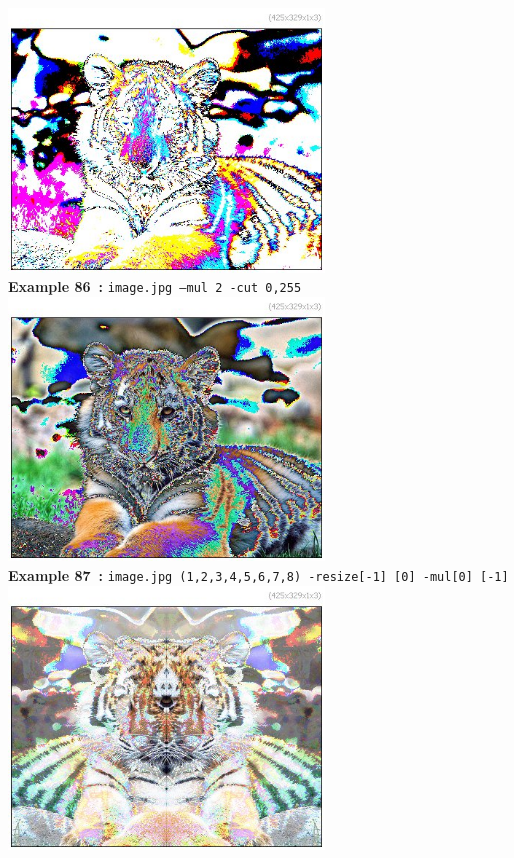 \documentclass[a4paper,11pt,twoside]{book}
\begin{document}
\begin{center}\includegraphics[keepaspectratio=true,height=7cm,width=\textwidth]{img/gmic_def86.jpg}\\
{\footnotesize \textbf{Example 86~:} \texttt{image.jpg --mul 2 -cut 0,255}}
\\\includegraphics[keepaspectratio=true,height=7cm,width=\textwidth]{img/gmic_def87.jpg}\\
{\footnotesize \textbf{Example 87~:} \texttt{image.jpg (1,2,3,4,5,6,7,8) -resize[-1] [0] -mul[0] [-1]}}
\\\includegraphics[keepaspectratio=true,height=7cm,width=\textwidth]{img/gmic_def88.jpg}\\

\end{center}
\end{document}
